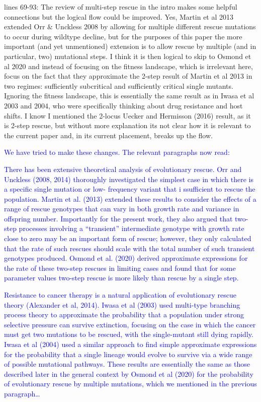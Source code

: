 \documentclass[12pt]{extarticle}
\begin{document}
lines 69-93: The review of multi-step rescue in the intro makes some helpful connections but the logical flow could be improved. Yes, Martin et al 2013 extended Orr $\&$ Unckless 2008 by allowing for multiple different rescue mutations to occur during wildtype decline, but for the purposes of this paper the more important (and yet unmentioned) extension is to allow rescue by multiple (and in particular, two) mutational steps. I think it is then logical to skip to Osmond et al 2020 and instead of focusing on the fitness landscape, which is irrelevant here, focus on the fact that they approximate the 2-step result of Martin et al 2013 in two regimes: sufficiently subcritical and sufficiently critical single mutants. Ignoring the fitness landscape, this is essentially the same result as in Iwasa et al 2003 and 2004, who were specifically thinking about drug resistance and host shifts. I know I mentioned the 2-locus Uecker and Hermisson (2016) result, as it is 2-step rescue, but without more explanation its not clear how it is relevant to the current paper and, in its current placement, breaks up the flow.

\textcolor{blue}{ We have tried to make these changes. The relevant paragraphs now read:}
\begin{displayquote}
	\textcolor{blue}{
    There has been extensive theoretical analysis of evolutionary rescue. Orr and Unckless (2008,
    2014) thoroughly investigated the simplest case in which there is a specific single mutation or low-
    frequency variant that i ssufficient to rescue the population. 
    Martin et al. (2013) extended these results
    to consider the effects of a range of rescue genotypes that can vary in both growth rate and variance in
    offspring number. 
    Importantly for the present work, they also argued that two-step processes involving
    a ``transient'' intermediate genotype with growth rate close to zero may be an important form of rescue;
    however, they only calculated that the rate of such rescues should scale with the total number of such
    transient genotypes produced. Osmond et al. (2020) derived approximate expressions for the rate of
    these two-step rescues in limiting cases and found that for some parameter values two-step rescue is
    more likely than rescue by a single step.}
    
    \textcolor{blue}{
    Resistance to cancer therapy is a natural application of evolutionary rescue theory (Alexander et al, 2014). 
    Iwasa et al (2003) used multi-type branching process theory to approximate the probability that a population under strong selective pressure can survive extinction, focusing on the case in which the cancer must get two mutations to be rescued, with the single-mutant still dying rapidly.
    Iwasa et al (2004) used a similar approach to find simple approximate expressions for the probability that a single lineage would evolve to survive via a wide range of possible mutational pathways.
    These results are essentially the same as those described later in the general context by Osmond et al (2020) for the probability of evolutionary rescue by multiple mutations,
    which we mentioned in the previous paragraph\ldots}
\end{displayquote}
\end{document}
